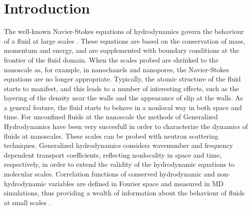 \documentclass[b5paper,openright,11pt]{book}
\begin{document}
\section{Introduction}

%

The well-known Navier-Stokes equations of hydrodynamics govern the behaviour of a fluid at large scales \cite{Bird1987, Clarke1995,Rubbert1968}. These equations are based on the conservation of mass, momentum and energy, and are supplemented with
boundary conditions  at the  frontier of the  fluid domain. When the
scales  probed are  shrinked  to  the nanoscale  as,  for example,  in
nanochanels and  nanopores, the Navier-Stokes equations  are no longer
appropriate. Typically,  the atomic structure  of the fluid  starts to
manifest, and this  leads to a number of interesting  effects, such as
the layering of the density near  the walls and the appearance of slip
at the walls.  As a general feature,  the fluid starts to  behave in a
nonlocal way  in both space and  time.  For unconfined fluids  at the
nanoscale the methods of Generalized Hydrodynamics \cite{Boon1980,Mountain1977,
 Hansen2013,Alley1984}  have been very succesfull  in order
to  characterize the  dynamics of  fluids  at nanoscales. These scales can  be
probed with neutron scattering techniques.  Generalized hydrodynamics
considers wavenumber  and frequency dependent  transport coefficients,
reflecting nonlocality in  space and time, respectively,  in order to
extend the validity of the hydrodynamic equations to molecular scales.
Correlation functions of conserved hydrodynamic  and non-hydrodynamic
variables are defined in Fourier space and measured in MD simulations,
thus providing a  wealth of information about the  behaviour of fluids
at small scales \cite{Chung1969,DeSchepper1988,Khayat1989}.
\end{document}
